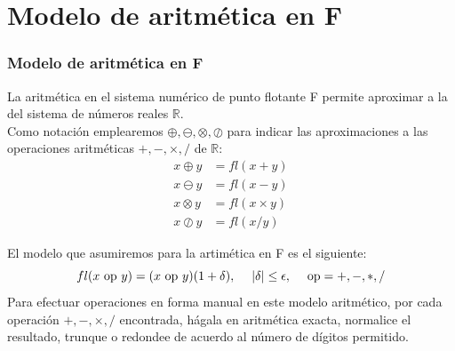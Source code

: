 \section{Modelo de aritmética en F}
\begin{frame}
\frametitle{Modelo de aritmética en F}
La aritmética en el sistema numérico de punto flotante F permite aproximar a la del sistema de números reales $\mathbb{R}$.
\\
\medskip
Como notación emplearemos $\oplus,  \ominus,  \otimes,  \oslash $ para indicar las aproximaciones a las operaciones aritméticas $+, -, \times, /$ de $\mathbb{R}$:
\[ \begin{split}
x \oplus y &= fl(x+y) \\
x \ominus y &= fl(x-y) \\
x \otimes y &= fl(x \times y) \\
x \oslash y &= fl(x/y)
\end{split} \]
\end{frame}
\begin{frame}
El modelo que asumiremos para la artimética en F es el siguiente:
\[ fl(x \mbox{ op } y) = (x \mbox{ op } y) (1+\delta), \hspace{0.45cm} \vert \delta \vert \leq \epsilon, \hspace{0.45cm} \mbox{op}= +,-,*,/  \]
Para efectuar operaciones en forma manual en este modelo aritmético, por cada operación $+,-,\times, /$ encontrada, hágala en aritmética exacta, normalice el resultado, trunque o redondee de acuerdo al número de dígitos permitido.
\end{frame}

